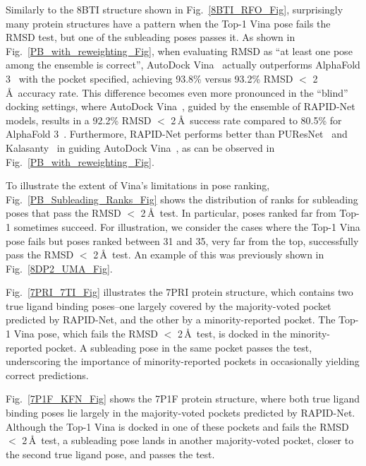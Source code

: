 \documentclass[10pt,conference]{IEEEtran}
\begin{document}
Similarly to the 8BTI structure shown in Fig.~\ref{8BTI_RFO_Fig}, surprisingly many protein structures have a pattern when the Top-1 Vina pose fails the RMSD test, but one of the subleading poses passes it. As shown in Fig.~\ref{PB_with_reweighting_Fig}, when evaluating RMSD as ``at least one pose among the ensemble is correct'', AutoDock Vina~\cite{eberhardt2021autodock} actually outperforms AlphaFold 3~\cite{abramson2024accurate} with the pocket specified, achieving 93.8\% versus 93.2\% RMSD $<$ 2\,\AA\ accuracy rate. This difference becomes even more pronounced in the ``blind'' docking settings, where AutoDock Vina~\cite{eberhardt2021autodock}, guided by the ensemble of RAPID-Net models, results in a 92.2\% RMSD $<$ 2\,\AA\ success rate compared to 80.5\% for AlphaFold 3~\cite{abramson2024accurate}. Furthermore, RAPID-Net performs better than PUResNet~\cite{kandel2021puresnet} and Kalasanty~\cite{stepniewska2020improving} in guiding AutoDock Vina~\cite{eberhardt2021autodock}, as can be observed in Fig.~\ref{PB_with_reweighting_Fig}.



To illustrate the extent of Vina's limitations in pose ranking, Fig.~\ref{PB_Subleading_Ranks_Fig} shows the distribution of ranks for subleading poses that pass the RMSD $<$ 2\,\AA\ test. In particular, poses ranked far from Top-1 sometimes succeed. For illustration, we consider the cases where the Top-1 Vina pose fails but poses ranked between 31 and 35, very far from the top, successfully pass the RMSD $<$ 2\,\AA\ test. An example of this was previously shown in Fig.~\ref{8DP2_UMA_Fig}.

Fig.~\ref{7PRI_7TI_Fig} illustrates the 7PRI protein structure, which contains two true ligand binding poses--one largely covered by the majority-voted pocket predicted by RAPID-Net, and the other by a minority-reported pocket. The Top-1 Vina pose, which fails the RMSD $<$ 2\,\AA\ test, is docked in the minority-reported pocket. A subleading pose in the same pocket passes the test, underscoring the importance of minority-reported pockets in occasionally yielding correct predictions.

Fig.~\ref{7P1F_KFN_Fig} shows the 7P1F protein structure, where both true ligand binding poses lie largely in the majority-voted pockets predicted by RAPID-Net. Although the Top-1 Vina is docked in one of these pockets and fails the RMSD $<$ 2\,\AA\ test, a subleading pose lands in another majority-voted pocket, closer to the second true ligand pose, and passes the test.
\end{document}
